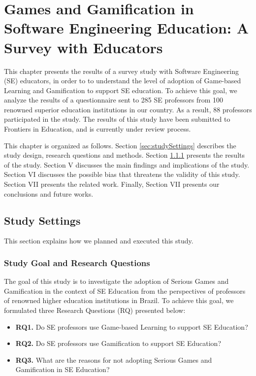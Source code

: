 \chapter{Games and Gamification in Software Engineering Education: A Survey with Educators}
\label{ch:survey}

This chapter presents the results of a survey study with Software Engineering (SE) educators, in order to to understand the level of adoption of Game-based Learning and Gamification to support SE education. To achieve this goal, we analyze the results of a questionnaire sent to 285 SE professors from 100 renowned superior education institutions in our country. As a result, 88 professors participated in the study. The results of this study have been submitted to Frontiers in Education, and is currently under review process.

This chapter is organized as follows. Section \ref{sec:studySettings} describes the study design, research questions and methods. Section \ref{sec:goals} presents the results of the study. Section V discusses the main findings and implications of the study. Section VI discusses the possible bias that threatens the validity of this study. Section VII presents the related work. Finally, Section VII presents our conclusions and future works.

\section{Study Settings}
\label{sec:studysettings}
This section explains how we planned and executed this study.

\subsection{Study Goal and Research Questions}
\label{sec:goals}

The goal of this study is to investigate the adoption of Serious Games and Gamification in the context of SE Education from the perspectives of professors of renowned higher education institutions in Brazil. To achieve this goal, we formulated three Research Questions (RQ) presented below:

\begin{itemize}
\item \textbf{RQ1.} Do SE professors use Game-based Learning to support SE Education? 

\item \textbf{RQ2.}  Do SE professors use Gamification to support SE Education?

\item \textbf{RQ3.}  What are the reasons for not adopting Serious Games and Gamification in SE Education?
\end{itemize}

